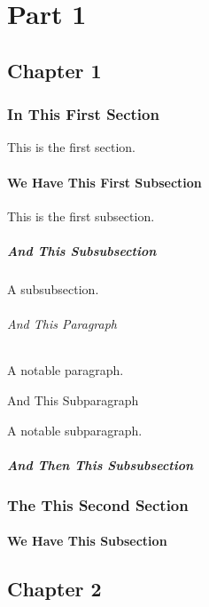 
\part{Part 1}

\chapter{Chapter 1}

\section{In This First Section}

This is the first section.

\subsection{We Have This First Subsection}

This is the first subsection.

\subsubsection{And This Subsubsection}

A subsubsection.

\paragraph{And This Paragraph}

A notable paragraph.

\subparagraph{And This Subparagraph}

A notable subparagraph.

\subsubsection{And Then This Subsubsection}
\section{The This Second Section}
\subsection{We Have This Subsection}

\chapter{Chapter 2}


